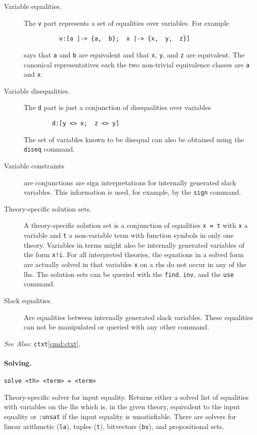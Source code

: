 \documentclass[12pt]{article}
\begin{document}
  \begin{description}
  \item[Variable equalities.] The \texttt{v} part represents a set of
       equalities over variables. For example
	  \begin{verbatim}
          v:[a |-> {a,  b};  x |-> {x,  y,  z}]
          \end{verbatim}
       says that \texttt{a} and \texttt{b} are equivalent
       and that \texttt{x}, \texttt{y}, and \texttt{z}
       are equivalent. The canonical representatives each the two non-trivial equivalence
       classes are \texttt{a} and \texttt{x}\@.
  \item[Variable disequalities.] The \texttt{d} part is just a conjunction of disequalities
       over variables
        \begin{verbatim}
        d:[y <> x;  z <> y]
        \end{verbatim}
       The set of variables known to be disequal can also be obtained using the \texttt{diseq}
       command.
  \item[Variable constraints] are conjunctions are sign interpretations for internally 
        generated slack variables. This information is used, for example, by the \texttt{sign}
        command.
  \item[Theory-specific solution sets.] A theory-specific solution set is a conjunction
        of equalities \texttt{x = t} with \texttt{x} a variable and \texttt{t} a non-variable
        term with function symbols in only one theory.  Variables in terms might also be
        internally generated variables of the form \texttt{x!i}\@.
        For all interpreted theories, the equations in a solved form are actually solved in that 
        variables \texttt{x} on a rhs do not occur in any of the lhs. 
        The solution sets can be queried with the \texttt{find}, \texttt{inv}, and the \texttt{use} command.
  \item[Slack equalities.]
         Are equalities between internally generated slack variables. These equalities can
         not be manipulated or queried with any other command.
  \end{description}

\noindent
{\em See Also:}  
\texttt{ctxt}\ref{cmd:ctxt},


\paragraph{Solving.}\label{cmd:solve}
  \begin{center}
  \texttt{solve <th> <term> = <term>} 
  \end{center}
Theory-specific solver for input equality. Returns either a solved 
list of equalities with variables on the lhs which is, in the given theory,
equivalent to the input equality or \texttt{:unsat} if the input equality is
unsatisfiable. There are solvers for linear arithmetic (\texttt{la}), 
tuples (\texttt{t}), bitvectors (\texttt{bv}), and propositional sets.
\end{document}
